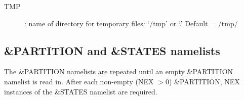 \documentclass[11pt]{article}
\begin{document}
\begin{description}
\item[TMP]:  name of directory for temporary files: `/tmp' or `.'  Default = /tmp/
%

\end{description}


\subsection{\&PARTITION and \&STATES namelists}
%
The \&PARTITION namelists are repeated until an empty \&PARTITION namelist is read in.
After each non-empty (NEX $> 0$) \&PARTITION, NEX instances of the \&STATES namelist are required.
\end{document}
